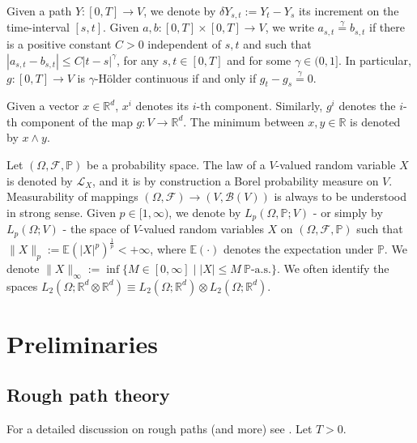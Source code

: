 \documentclass[10pt, a4paper]{article} %
\newcommand{\R}{\mathbb{R}}
\newcommand{\E}{\mathbb{E}}
\theoremstyle{definition}
\theoremstyle{plain}
\begin{document}
Given a path $Y:[0,T] \to V$, we denote by $\delta Y_{s,t} := Y_t - Y_s$ its increment on the time-interval $[s,t]$. Given $a, b : [0,T] \times [0,T] \to V$, we write $a_{s,t}\overset{\gamma}{=}b_{s,t}$ if there is a positive constant $C>0$ independent of $s,t$ and such that $|a_{s,t} - b_{s,t}| \le C |t-s|^\gamma$, for any $s,t \in [0,T]$ and for some $\gamma \in (0,1]$. 
In particular, $g:[0,T] \to V$ is $\gamma$-H\"older continuous if and only if $g_t-g_s \overset{\gamma}{=} 0$. 

Given a vector $x \in \R^d$, $x^i$ denotes its $i$-th component. Similarly, $g^i$ denotes the $i$-th component of the map $g : V \to \R^d$. The minimum between $x,y \in \R$ is denoted by $x \wedge y$.

Let $(\Omega,\mathcal{F},\mathbb{P})$ be a probability space. The law of a $V$-valued random variable $X$ is denoted by $\mathcal{L}_X$, and it is by construction a Borel probability measure on $V$. 
Measurability of mappings $(\Omega,\mathcal{F}) \to (V,\mathcal{B}(V))$ is always to be understood in strong sense.
Given $p \in [1,\infty)$, we denote by $L_p(\Omega,\mathbb{P};V)$ - or simply by $L_p(\Omega;V)$ - the space of $V$-valued random variables $X$ on $(\Omega,\mathcal{F},\mathbb{P})$ such that $\|X\|_p := \E (|X|^p)^\frac{1}{p} < +\infty$, where $\E(\cdot)$ denotes the expectation under $\mathbb{P}$. 
We denote $\|X\|_\infty := \inf\{M \in [0,\infty] \mid |X|\le M \  \mathbb{P}\text{-a.s.}\}$. 
We often identify the spaces $L_2(\Omega;\R^d \otimes \R^d) \equiv L_2(\Omega;\R^d) \otimes L_2(\Omega;\R^d)$. \\







\section{Preliminaries} \label{section:preliminaries}
\subsection{Rough path theory}
For a detailed discussion on rough paths (and more) see \cite{FRIZHAIRER}. 
Let $T > 0$. 
\end{document}
